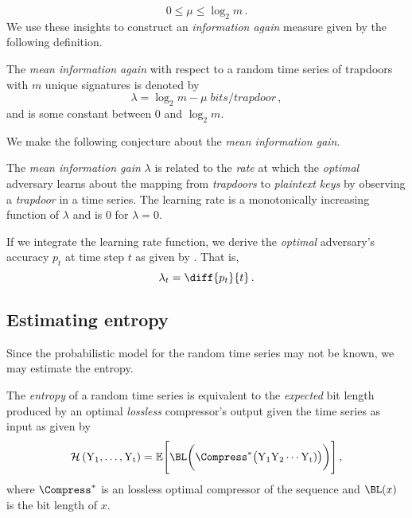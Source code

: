 \documentclass[ ../main.tex]{subfiles}
\begin{document}
\begin{equation}
    0 \leq \mu \leq \log_2 m\,.
\end{equation}
We use these insights to construct an \emph{information again} measure given by the following definition.
\begin{definition}
The \emph{mean information again} with respect to a random time series of trapdoors with $m$ unique signatures is denoted by
\begin{equation}
    \lambda = \log_2 m -  \mu \; \si{bits \per trapdoor}\,,
\end{equation}
and is some constant between $0$ and $\log_2 m$.
\end{definition}
We make the following conjecture about the \emph{mean information gain}.
\begin{conjecture}
The \emph{mean information gain} $\lambda$ is related to the \emph{rate} at which the \emph{optimal} adversary learns about the mapping from \emph{trapdoors} to \emph{plaintext keys} by observing a \emph{trapdoor} in a time series. The learning rate is a monotonically increasing function of $\lambda$ and is $0$ for $\lambda = 0$.
\end{conjecture}
If we integrate the learning rate function, we derive the \emph{optimal} adversary's accuracy $p_t$ at time step $t$ as given by . That is,
\begin{equation}
    \lambda_t = \diff{p_t}{t}\,.
\end{equation}

\subsection{Estimating entropy}
Since the probabilistic model for the random time series may not be known, we may estimate the entropy.
\begin{postulate}
\label{post:optcomp}
The \emph{entropy} of a random time series is equivalent to the \emph{expected} bit length produced by an optimal \emph{lossless} compressor's output given the time series as input as given by
\begin{equation}
    \entropy\left(\rv{Y_1},\ldots,\rv{Y_t}\right) =
    \expectation\Biggl[
        \BL\biggl(
            \Compress^*\bigl(
                \rv{Y_1} \rv{Y_2} \cdots \rv{Y_t}
                )
            \bigr)
        \biggr)
    \Biggr]\,,
\end{equation}
where $\Compress^*$ is an lossless optimal compressor of the sequence and $\BL(x)$ is the bit length of $x$.
\end{postulate}
\end{document}
